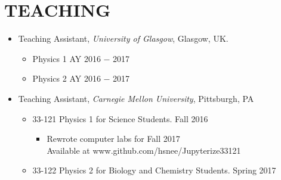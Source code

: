 \section{TEACHING}
\renewcommand\labelitemii{$\square$}
\begin{itemize}
\item Teaching Assistant, {\sl University of Glasgow}, Glasgow, UK.
\begin{itemize}
\item Physics 1 \hfill AY 2016 $-$ 2017
\item Physics 2 \hfill AY 2016 $-$ 2017
\end{itemize}
\item Teaching Assistant, {\sl Carnegie Mellon University}, Pittsburgh, PA
	\begin{itemize}
	\item 33-121 Physics 1 for Science Students. \hfill Fall 2016
		\begin{itemize}
		\item Rewrote computer labs for Fall 2017 \\ Available at www.github.com/hsnee/Jupyterize33121
		\end{itemize}
	\item 33-122 Physics 2 for Biology and Chemistry Students. \hfill Spring 2017
	\end{itemize}
\end{itemize}

